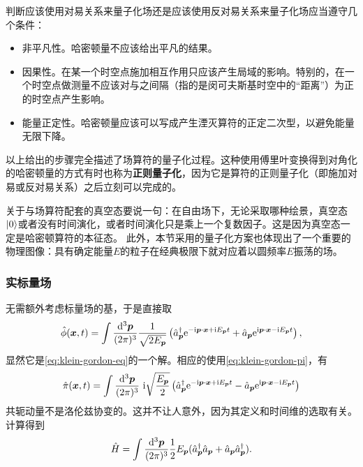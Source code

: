 \documentclass[hyperref, UTF8, a4paper]{ctexart}
\newcommand*{\ii}{\mathrm{i}}
\newcommand*{\ee}{\mathrm{e}}
\begin{document}
判断应该使用对易关系来量子化场还是应该使用反对易关系来量子化场应当遵守几个条件：
\begin{itemize}
    \item 非平凡性。哈密顿量不应该给出平凡的结果。
    \item 因果性。在某一个时空点施加相互作用只应该产生局域的影响。特别的，在一个时空点做测量不应该对与之间隔（指的是闵可夫斯基时空中的“距离”）为正的时空点产生影响。
    \item 能量正定性。哈密顿量应该可以写成产生湮灭算符的正定二次型，以避免能量无限下降。
\end{itemize}

以上给出的步骤完全描述了场算符的量子化过程。这种使用傅里叶变换得到对角化的哈密顿量的方式有时也称为\textbf{正则量子化}，因为它是算符的正则量子化（即施加对易或反对易关系）之后立刻可以完成的。

关于与场算符配套的真空态要说一句：在自由场下，无论采取哪种绘景，真空态$\ket{0}$或者没有时间演化，或者时间演化只是乘上一个复数因子。这是因为真空态一定是哈密顿算符的本征态。
此外，本节采用的量子化方案也体现出了一个重要的物理图像：具有确定能量$E$的粒子在经典极限下就对应着以圆频率$E$振荡的场。

\subsubsection{实标量场}

无需额外考虑标量场的基，于是直接取
\begin{equation}
    \hat{\phi}(\vb*{x}, t) = \int \frac{\dd[3]{\vb*{p}}}{(2\pi)^3} \frac{1}{\sqrt{2 E_{\vb*{p}}}} \left( \hat{a}^\dagger_{\vb*{p}} \ee^{ - \ii \vb*{p} \cdot \vb*{x} + \ii E_{\vb*{p}} t} + \hat{a}_{\vb*{p}} \ee^{ \ii \vb*{p} \cdot \vb*{x} - \ii E_{\vb*{p}} t} \right),
    \label{eq:expanding-klein-gordon-field}
\end{equation}
显然它是\eqref{eq:klein-gordon-eq}的一个解。相应的使用\eqref{eq:klein-gordon-pi}，有
\begin{equation}
    \hat{\pi}(\vb*{x}, t) = \int \frac{\dd[3]{\vb*{p}}}{(2\pi)^3} \  \ii \sqrt{\frac{E_{\vb*{p}}}{2}} \left( \hat{a}^\dagger_{\vb*{p}} \ee^{ - \ii \vb*{p} \cdot \vb*{x} + \ii E_{\vb*{p}} t} - \hat{a}_{\vb*{p}} \ee^{ \ii \vb*{p} \cdot \vb*{x} - \ii E_{\vb*{p}} t} \right)
\end{equation}
共轭动量不是洛伦兹协变的。这并不让人意外，因为其定义和时间维的选取有关。
计算得到
\[
    \hat{H} = \int \frac{\dd[3]{\vb*{p}}}{(2\pi)^3} \frac{1}{2} E_{\vb*{p}} (\hat{a}_{\vb*{p}}^\dagger \hat{a}_{\vb*{p}} + \hat{a}_{\vb*{p}} \hat{a}^\dagger_{\vb*{p}}).
\]
\end{document}
